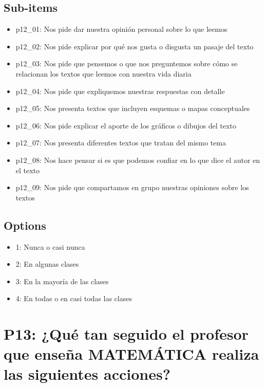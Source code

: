 \documentclass[11pt]{article}
\begin{document}
\subsection*{Sub-items}
\begin{itemize}[leftmargin=*]
  \item p12\_01: Nos pide dar nuestra opinión personal sobre lo que leemos
  \item p12\_02: Nos pide explicar por qué nos gusta o disgusta un pasaje del texto
  \item p12\_03: Nos pide que pensemos o que nos preguntemos sobre cómo se relacionan los textos que leemos con nuestra vida diaria
  \item p12\_04: Nos pide que expliquemos nuestras respuestas con detalle
  \item p12\_05: Nos presenta textos que incluyen esquemas o mapas conceptuales
  \item p12\_06: Nos pide explicar el aporte de los gráficos o dibujos del texto
  \item p12\_07: Nos presenta diferentes textos que tratan del mismo tema
  \item p12\_08: Nos hace pensar si es que podemos confiar en lo que dice el autor en el texto
  \item p12\_09: Nos pide que compartamos en grupo nuestras opiniones sobre los textos
\end{itemize}
\subsection*{Options}
\begin{itemize}[leftmargin=*]
  \item 1: Nunca o casi nunca
  \item 2: En algunas clases
  \item 3: En la mayoría de las clases
  \item 4: En todas o en casi todas las clases
\end{itemize}
\bigskip
\section*{P13: ¿Qué tan seguido el profesor que enseña MATEMÁTICA realiza las siguientes acciones?}
\end{document}
